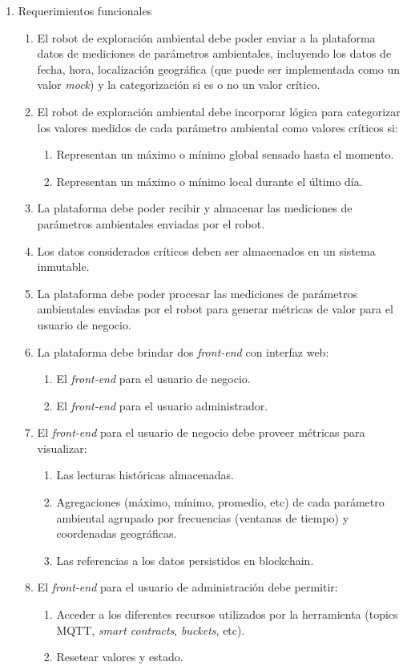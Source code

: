 \begin{enumerate}	
	\item Requerimientos funcionales		
	\begin{enumerate}	
		
		\item El robot de exploración ambiental debe poder enviar a la plataforma datos de mediciones de parámetros ambientales, incluyendo los datos de fecha, hora, localización geográfica (que puede ser implementada como un valor \textit{mock}) y la categorización si es o no un valor crítico.
		\item El robot de exploración ambiental debe incorporar lógica para categorizar los valores medidos de cada parámetro ambiental como valores críticos si:
		\begin{enumerate}				
			\item Representan un máximo o mínimo global sensado hasta el momento.				
			\item Representan un máximo o mínimo local durante el último día.				
		\end{enumerate}			
		\item La plataforma debe poder recibir y almacenar las mediciones de parámetros ambientales enviadas por el robot.
		\item Los datos considerados críticos deben ser almacenados en un sistema inmutable.
		\item La plataforma debe poder procesar las mediciones de parámetros ambientales enviadas por el robot para generar métricas de valor para el usuario de negocio.		
		\item La plataforma debe brindar dos \textit{front-end} con interfaz web:
			\begin{enumerate}				
				\item El \textit{front-end} para el usuario de negocio.				
				\item El \textit{front-end} para el usuario administrador.				
			\end{enumerate}			
		
		\item El \textit{front-end} para el usuario de negocio debe proveer métricas para visualizar:
			\begin{enumerate}				
				\item Las lecturas históricas almacenadas.				
				\item Agregaciones (máximo, mínimo, promedio, etc) de cada parámetro ambiental agrupado por frecuencias (ventanas de tiempo) y coordenadas geográficas.				
				\item Las referencias a los datos persistidos en blockchain.
			\end{enumerate}			
		\item El \textit{front-end} para el usuario de administración debe permitir:
			\begin{enumerate}				
				\item Acceder a los diferentes recursos utilizados por la herramienta (topics MQTT, \textit{smart contracts}, \textit{buckets}, etc).
				\item Resetear valores y estado.			
			\end{enumerate}			
		\end{enumerate}	


\end{enumerate}
